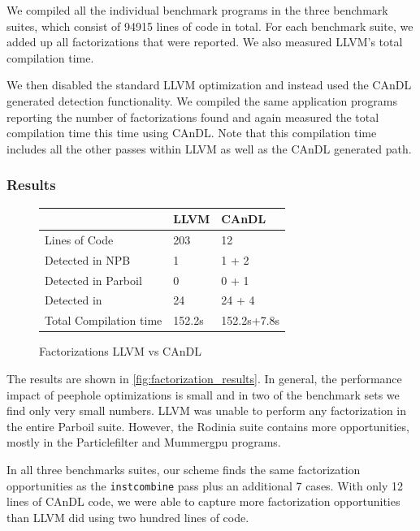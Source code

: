     We compiled all the individual benchmark programs in the three benchmark
    suites, which consist of 94915 lines of code in total.
    For each benchmark suite, we added up all factorizations that were
    reported.
    We also measured LLVM's total compilation time.  

    We then disabled the standard LLVM optimization and instead used the CAnDL
    generated detection functionality.
    We compiled the same application programs reporting the number of
    factorizations found and again measured the total compilation time this time
    using CAnDL.
    Note that this compilation time includes all the other passes within LLVM as
    well as the CAnDL generated path.

\subsubsection{Results}
\begin{figure}[ht]
\centering
\begin{tabular}{|l||l|l|}
\hline
         & LLVM  &CAnDL \\
\hline
\hline
Lines of Code & 203 & 12 \\ \hline
Detected in NPB & 1 & 1 + 2 \\
Detected in Parboil & 0 & 0 + 1\\
Detected in  & 24 & 24 + 4\\ \hline
Total Compilation time & 152.2s & 152.2s+7.8s \\ \hline
\hline
\end{tabular}
\vspace{-0.1cm}
\caption{Factorizations LLVM vs CAnDL}
\label{fig:factorization_results}
\end{figure}

    The results are shown in \autoref{fig:factorization_results}.
    In general, the performance impact of peephole optimizations is small
    and in two of the benchmark sets we find only very small numbers.
    LLVM was unable to perform any factorization in the entire Parboil suite.
    However,  the Rodinia suite contains more opportunities, mostly in the
    Particlefilter and Mummergpu programs.

    In all three benchmarks suites, our scheme finds the same factorization
    opportunities as the \texttt{instcombine} pass plus an additional 7 cases.
    With only 12 lines of CAnDL code, we were able to capture more factorization
    opportunities than LLVM did using two hundred lines of code.

